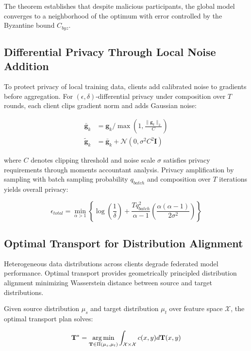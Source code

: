 The theorem establishes that despite malicious participants, the global model converges to a neighborhood of the optimum with error controlled by the Byzantine bound $C_{byz}$.

\subsection{Differential Privacy Through Local Noise Addition}

To protect privacy of local training data, clients add calibrated noise to gradients before aggregation. For $(\epsilon, \delta)$-differential privacy under composition over $T$ rounds, each client clips gradient norm and adds Gaussian noise:

\begin{align}
\bar{\mathbf{g}}_k &= \mathbf{g}_k / \max\left(1, \frac{\|\mathbf{g}_k\|_2}{C}\right) \\
\tilde{\mathbf{g}}_k &= \bar{\mathbf{g}}_k + \mathcal{N}(0, \sigma^2 C^2 \mathbf{I})
\end{align}

where $C$ denotes clipping threshold and noise scale $\sigma$ satisfies privacy requirements through moments accountant analysis. Privacy amplification by sampling with batch sampling probability $q_{batch}$ and composition over $T$ iterations yields overall privacy:

\begin{equation}
\epsilon_{total} = \min_{\alpha > 1} \left\{\log\left(\frac{1}{\delta}\right) + \frac{T q_{batch}^2}{\alpha - 1} \left(\frac{\alpha(\alpha-1)}{2\sigma^2}\right)\right\}
\end{equation}

\subsection{Optimal Transport for Distribution Alignment}

Heterogeneous data distributions across clients degrade federated model performance. Optimal transport provides geometrically principled distribution alignment minimizing Wasserstein distance between source and target distributions.

Given source distribution $\mu_s$ and target distribution $\mu_t$ over feature space $\mathcal{X}$, the optimal transport plan solves:

\begin{equation}
\mathbf{T}^* = \operatorname*{arg\,min}_{\mathbf{T} \in \Pi(\mu_s, \mu_t)} \int_{\mathcal{X} \times \mathcal{X}} c(x, y) d\mathbf{T}(x, y)
\end{equation}

